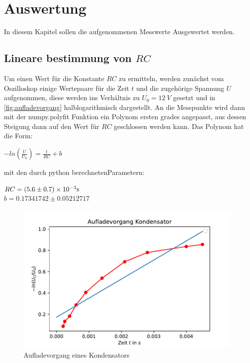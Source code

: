 \section{Auswertung}
\label{sec:Auswertung}
In diesem Kapitel sollen die aufgenommenen Messwerte Ausgewertet werden.
\subsection{Lineare bestimmung von $RC$}
\label{sec:auswertungeins}
Um einen Wert für die Konstante $RC$ zu ermitteln, werden zunächst vom Oszilloskop einige Wertepaare
für die Zeit $t$ und die zugehörige Spannung $U$ aufgenommen, diese werden ins Verhältnis
zu $U_0=\SI[]{12}[]{V}$ gesetzt und in \autoref{fig:aufladevorgang} halblogarithmisch dargestellt.
An die Messpunkte wird dann mit der numpy.polyfit Funktion ein Polynom ersten grades angepasst, aus
dessen Steigung dann auf den Wert für $RC$ geschlossen werden kann. Das Polynom hat die Form:
\begin{center}
    $-ln(\frac{U}{U_0})=\frac{t}{RC}+b$\\
\end{center}
mit den durch python berechnetenParametern:
\begin{center}
    $RC=(5.6\pm0.7)\times 10^{-3}\si[]{s}$\\
    $b=0.17341742 \pm 0.05212717$\\
\end{center}
\begin{figure}
    \centering
    \includegraphics{aufladevorgang.pdf}
    \caption{Aufladevorgang eines Kondensators}
    \label{fig:aufladevorgang}
  \end{figure}

